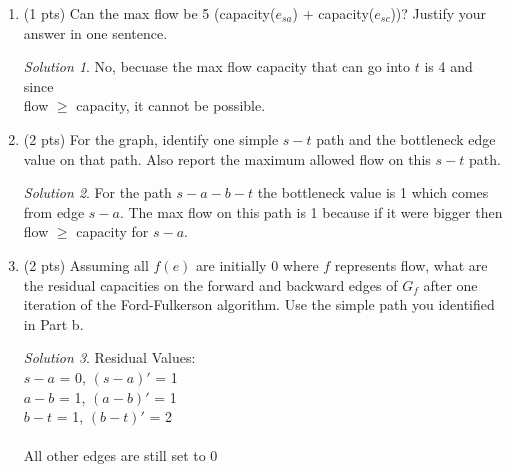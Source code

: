 \documentclass[12pt]{article}
\theoremstyle{remark}
\newtheorem*{solution}{Solution}
\begin{document}
\begin{enumerate}
\begin{enumerate}
\item (1 pts) Can the max flow be 5 (capacity($e_{sa}$) + capacity($e_{sc}$))? Justify your answer in one sentence.
\begin{solution}
No, becuase the max flow capacity that can go into $t$ is 4 and since \\flow $\geq$ capacity, it cannot be possible.
\end{solution}

\item (2 pts) For the graph, identify one simple $s-t$ path and the bottleneck edge value on that path. Also report the maximum allowed flow on this $s-t$ path.
\begin{solution}
For the path $s-a-b-t$ the bottleneck value is 1 which comes from edge $s-a$. The max flow on this path is 1 because if it were bigger then \\flow $\geq$ capacity for $s-a$.
\end{solution}

\item (2 pts) Assuming all $f(e)$ are initially 0 where $f$ represents flow, what are the residual capacities on the forward and backward edges of $G_f$ after one iteration of the Ford-Fulkerson algorithm. Use the simple path you identified in Part b. 
\begin{solution} Residual Values: \\
$s-a$ = 0, $(s-a)'$ = 1 \\ 
$a-b$ = 1, $(a-b)'$ = 1 \\ 
$b-t$ = 1, $(b-t)'$ = 2 \\ 
\\ All other edges are still set to 0
\end{solution}

\end{enumerate}
\end{enumerate}
\end{document}

